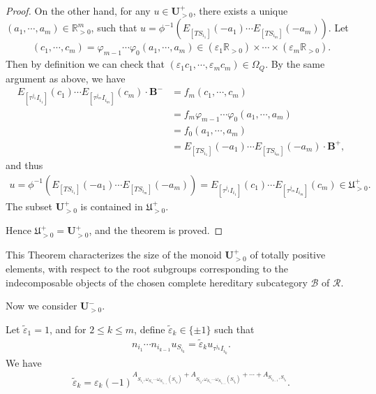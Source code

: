 \documentclass[12pt]{amsart}
\begin{document}
\begin{proof}
On the other hand, for any $u\in \mathbf{U}^+_{>0}$, there exists a unique $(a_1,\cdots,a_m)\in \mathbb{R}^m_{>0}$, such that $u=\phi^{-1}(E_{[TS_{i_1}]}(-a_1)\cdots E_{[TS_{i_m}]}(-a_m))$.
Let 
\begin{align*}
    (c_1,\cdots,c_m)=\varphi_{m-1}\cdots\varphi_0(a_1,\cdots,a_m)\in (\varepsilon_1\mathbb{R}_{>0})\times \cdots \times (\varepsilon_m \mathbb{R}_{>0}).
\end{align*}
Then by definition we can check that $(\varepsilon_1c_1,\cdots,\varepsilon_m c_m)\in \Omega_Q$.
By the same argument as above, we have 
\begin{align*}
    E_{[\tau^{j_1}I_{i_1}]}(c_1) \cdots E_{[\tau^{j_m}I_{i_m}]}(c_m)\cdot \mathbf{B}^- &= f_m(c_1,\cdots,c_m)\\
    &=f_m\varphi_{m-1}\cdots\varphi_0(a_1,\cdots,a_m)\\
    &=f_0(a_1,\cdots,a_m)\\
    &=E_{[TS_{i_1}]}(-a_1)\cdots E_{[TS_{i_m}]}(-a_m) \cdot \mathbf{B}^+,
\end{align*}
and thus 
\begin{align*}
    u=\phi^{-1}(E_{[TS_{i_1}]}(-a_1)\cdots E_{[TS_{i_m}]}(-a_m))=E_{[\tau^{j_1}I_{i_1}]}(c_1) \cdots E_{[\tau^{j_m}I_{i_m}]}(c_m) \in \mathfrak{U}^+_{>0}.
\end{align*}
The subset $\mathbf{U}^+_{>0}$ is contained in $\mathfrak{U}^+_{>0}$.

Hence $\mathfrak{U}^+_{>0}=\mathbf{U}^+_{>0}$, and the theorem is proved.
\end{proof}

This Theorem characterizes the size of the monoid $\mathbf{U}^+_{>0}$ of totally positive elements, with respect to the root subgroups corresponding to the indecomposable objects of the chosen complete hereditary subcategory $\mathcal{B}$ of $\mathcal{R}$.

Now we consider $\mathbf{U}^-_{>0}$.

Let $\tilde{\varepsilon}_1=1$, and for $2\leq k\leq m$, define $\tilde{\varepsilon}_k\in \{\pm 1\}$ such that 
\begin{align*}
    n_{i_1}\cdots n_{i_{k-1}} u_{S_{i_k}}=\tilde{\varepsilon}_k u_{\tau^{j_k}I_{i_k}}.
\end{align*}
We have 
\begin{align*}
    \tilde{\varepsilon}_k=\varepsilon_k (-1)^{A_{S_{i_1},\omega_{S_{i_2}}\cdots\omega_{S_{i_{k-1}}}(S_{i_k})}+A_{S_{i_2},\omega_{S_{i_3}}\cdots\omega_{S_{i_{k-1}}}(S_{i_k})}+\cdots+A_{S_{i_{k-1}},S_{i_k}}}.
\end{align*}
\end{document}
